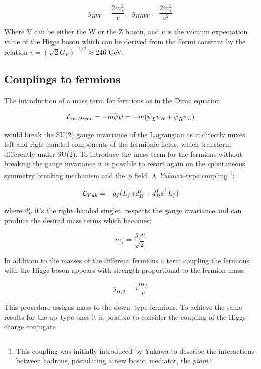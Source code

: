 \begin{equation}
g_{HVV}=\frac{2m^2_V}{v}, \,\,\,   g_{HHVV}=\frac{2m^2_V}{v^2}
\end{equation}

Where V can be either the W or the Z boson, and $v$ is the vacuum expectation value of the Higgs boson which can be derived from the Fermi constant by the relation $v = (\sqrt{2}G_F)^{-1/2} \approx 246$ GeV.

\subsection{Couplings to fermions}

The introduction of a mass term for fermions as in the Dirac equation 

\begin{equation}
\mathcal{L}_{m,Dirac}= -m\overline{\psi}\psi=-m(\overline{\psi}_L\psi_R+\overline{\psi}_R\psi_L)
\end{equation}

would break the SU(2) gauge invariance of the Lagrangian as it directly mixes left and right handed components of the fermionic fields, which transform differently under SU(2). To introduce the mass term for the fermions without breaking the gauge invariance it is possible to resort again on the spontaneous symmetry breaking mechanism and the $\phi$ field. A \emph{Yukawa}--type coupling
\footnote{This coupling was initially introduced by Yukawa \cite{Yukawa:1935xg} to describe the interactions between hadrons, postulating a new boson mediator, the \emph{pion}}:

\begin{equation}
\mathcal{L}_{Yuk}=-g_f(L_f \phi d^f_R + d^f_R \phi^{^\dagger} L_f)
\end{equation}

where $d^f_R$ it's the right--handed singlet, respects the gauge invariance and can produce the desired mass terms which becomes:

\begin{equation}
m_f = \frac{g_f v}{\sqrt{2}}
\end{equation}

In addition to the masses of the different fermions a term coupling the fermions with the Higgs boson appears with strength proportional to the fermion mass:

\begin{equation}
g_{Hff}=i\frac{m_f}{v}
\end{equation}

This procedure assigns mass to the down--type fermions. To achieve the same results for the up--type ones it is possible to consider the coupling of the Higgs charge conjugate


